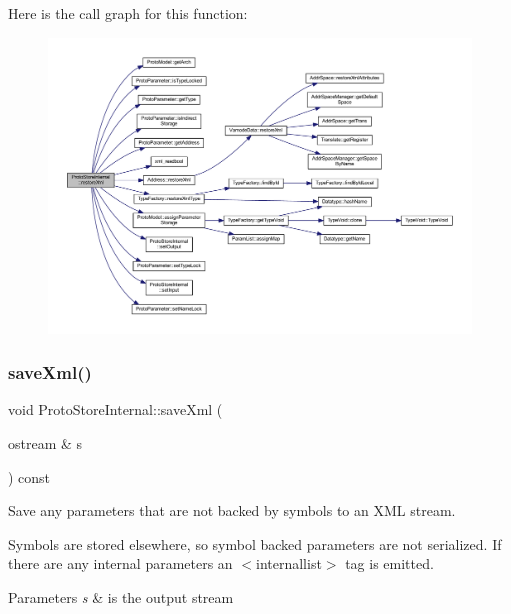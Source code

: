 Here is the call graph for this function\+:
\nopagebreak
\begin{figure}[H]
\begin{center}
\leavevmode
\includegraphics[width=350pt]{class_proto_store_internal_ae1c3cd409eda277f1ff924cf858eddef_cgraph}
\end{center}
\end{figure}
\mbox{\label{class_proto_store_internal_a1ad86117b6c4aaace47788adaef58880}} 
\subsubsection{\texorpdfstring{saveXml()}{saveXml()}}
{\footnotesize\ttfamily void Proto\+Store\+Internal\+::save\+Xml (\begin{DoxyParamCaption}\item[{ostream \&}]{s }\end{DoxyParamCaption}) const\hspace{0.3cm}{\ttfamily [virtual]}}



Save any parameters that are not backed by symbols to an X\+ML stream. 

Symbols are stored elsewhere, so symbol backed parameters are not serialized. If there are any internal parameters an $<$internallist$>$ tag is emitted. 
\begin{DoxyParams}{Parameters}
{\em s} & is the output stream \\
\hline
\end{DoxyParams}


